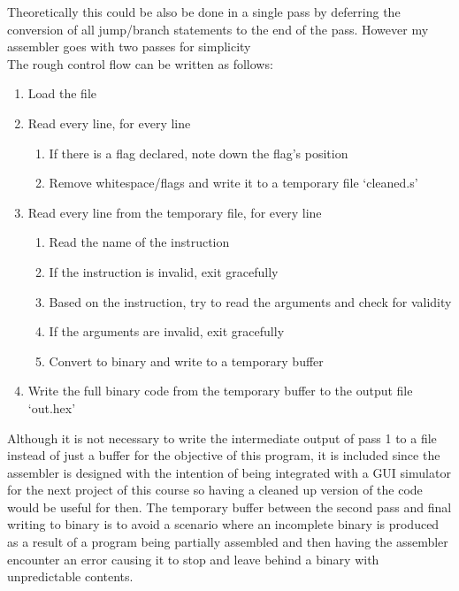 \documentclass[journal,12pt,onecolumn]{IEEEtran}
\theoremstyle{remark}
\begin{document}
	Theoretically this could be also be done in a single pass by deferring the conversion of all jump/branch statements to the end of the pass. However my assembler goes with two passes for simplicity\\
	The rough control flow can be written as follows:\\

	\begin{enumerate}
		\item{Load the file}
		
		\item{Read every line, for every line \begin{enumerate} 
			\item{If there is a flag declared, note down the flag's position}
			\item{Remove whitespace/flags and write it to a temporary file `cleaned.s'}
			\end{enumerate}}

		\item{Read every line from the temporary file, for every line\begin{enumerate} 
			\item{Read the name of the instruction}
			\item{If the instruction is invalid, exit gracefully}
			\item{Based on the instruction, try to read the arguments and check for validity}
			\item{If the arguments are invalid, exit gracefully}
			\item{Convert to binary and write to a temporary buffer}
			\end{enumerate}}

		\item{Write the full binary code from the temporary buffer to the output file `out.hex'\\}
	\end{enumerate}

	Although it is not necessary to write the intermediate output of pass 1 to a file instead of just a buffer for the objective of this program, it is included since the assembler is designed with the intention of being integrated with a GUI simulator for the next project of this course so having a cleaned up version of the code would be useful for then.
	The temporary buffer between the second pass and final writing to binary is to avoid a scenario where an incomplete binary is produced as a result of a program being partially assembled and then having the assembler encounter an error causing it to stop and leave behind a binary with unpredictable contents.
\end{document}

